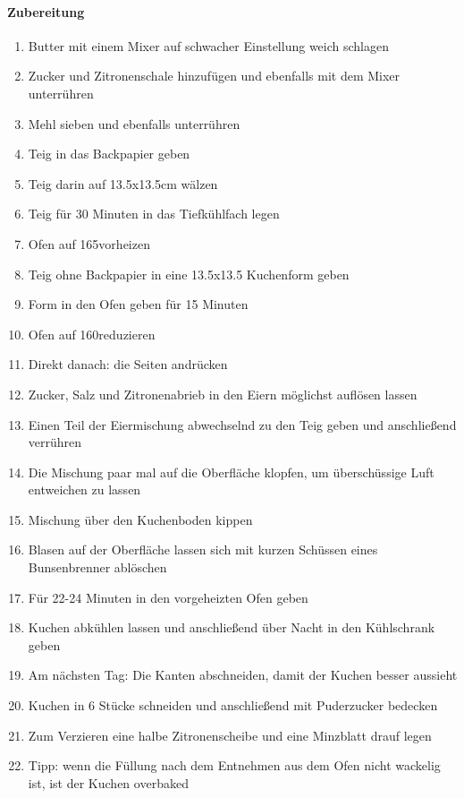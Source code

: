 \paragraph{Zubereitung}
\begin{enumerate}[noitemsep]
	\item Butter mit einem Mixer auf schwacher Einstellung weich schlagen 
	\item Zucker und Zitronenschale hinzufügen und ebenfalls mit dem Mixer unterrühren
	\item Mehl sieben und ebenfalls unterrühren
	\item Teig in das Backpapier geben
	\item Teig darin auf 13.5x13.5cm wälzen
	\item Teig für 30 Minuten in das Tiefkühlfach legen
	\item Ofen auf 165\textdegreeC vorheizen
	\item Teig ohne Backpapier in eine 13.5x13.5 Kuchenform geben
	\item Form in den Ofen geben für 15 Minuten
	\item Ofen auf 160\textdegree reduzieren
	\item Direkt danach: die Seiten andrücken
	\item Zucker, Salz und Zitronenabrieb in den Eiern möglichst auflösen lassen
	\item Einen Teil der Eiermischung abwechselnd zu den Teig geben und anschließend verrühren
	\item Die Mischung paar mal auf die Oberfläche klopfen, um überschüssige Luft entweichen zu lassen
	\item Mischung über den Kuchenboden kippen
	\item Blasen auf der Oberfläche lassen sich mit kurzen Schüssen eines Bunsenbrenner ablöschen
	\item Für 22-24 Minuten in den vorgeheizten Ofen geben
	\item Kuchen abkühlen lassen und anschließend über Nacht in den Kühlschrank geben
	\item Am nächsten Tag: Die Kanten abschneiden, damit der Kuchen besser aussieht
	\item Kuchen in 6 Stücke schneiden und anschließend mit Puderzucker bedecken
	\item Zum Verzieren eine halbe Zitronenscheibe und eine Minzblatt drauf legen
	\item Tipp: wenn die Füllung nach dem Entnehmen aus dem Ofen nicht wackelig ist, ist der Kuchen overbaked
\end{enumerate}